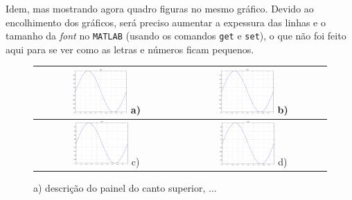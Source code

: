 \documentclass[11pt,twoside,a4paper]{report}
\begin{document}
Idem, mas mostrando agora quadro figuras no mesmo gr\'afico. Devido ao encolhimento dos
gr\'aficos, ser\'a preciso aumentar a expessura das linhas e o tamanho da \textit{font} no
\texttt{MATLAB} (usando os comandos \verb+get+ e \verb+set+), o que n\~ao foi feito aqui para se
ver como as letras e n\'umeros ficam pequenos.
\begin{figure}
  \centering
  \begin{tabular}{|c|c|}
    \hline
      \includegraphics[width=0.4\textwidth]{example_fig.eps} a) &
      \includegraphics[width=0.4\textwidth]{example_fig.eps} b) \\
    \hline
      \includegraphics[width=0.4\textwidth]{example_fig.eps} c) &
      \includegraphics[width=0.4\textwidth]{example_fig.eps} d) \\
    \hline
  \end{tabular}
  \caption{a) descri\c c\~ao do painel do canto superior, $\ldots$}
  \label{f:seno2}
\end{figure}
\end{document}
